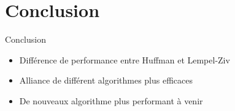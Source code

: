 \documentclass[french]{beamer}
\begin{document}
\section{Conclusion}
\begin{frame}{Conclusion}
	\begin{center}
		\begin{itemize}
		\item<2-4> Différence de performance entre Huffman et Lempel-Ziv
		\item<3-4> Alliance de différent algorithmes plus efficaces
		\item<4> De nouveaux algorithme plus performant à venir
		\end{itemize}
	\end{center}
\end{frame}
\end{document}
